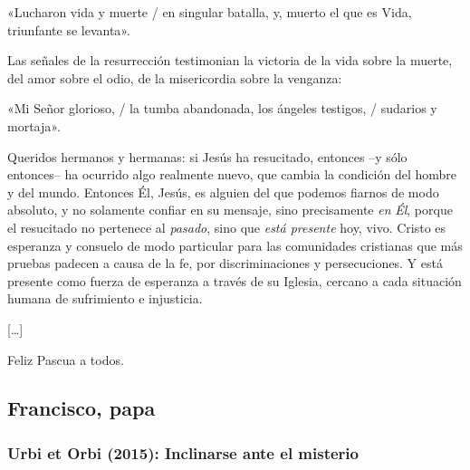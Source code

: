 \begin{body}
\begin{bodyprose}
«Lucharon vida y muerte  /  en singular batalla,  
  y, muerto el que es Vida, triunfante se levanta». 
\end{bodyprose}

Las señales de la resurrección testimonian la victoria de la vida sobre la muerte, del amor sobre el odio, de la misericordia sobre la venganza: 

\begin{bodyprose}
«Mi Señor glorioso,  /  la tumba abandonada, 
   los ángeles testigos, / sudarios y mortaja». 
\end{bodyprose}

Queridos hermanos y hermanas: si Jesús ha resucitado, entonces –y sólo entonces– ha ocurrido algo realmente nuevo, que cambia la condición del hombre y del mundo. Entonces Él, Jesús, es alguien del que podemos fiarnos de modo absoluto, y no solamente confiar en su mensaje, sino precisamente \textit{en} \textit{Él}, porque el resucitado no pertenece al \textit{pasado}, sino que \textit{está presente} hoy, vivo. Cristo es esperanza y consuelo de modo particular para las comunidades cristianas que más pruebas padecen a causa de la fe, por discriminaciones y persecuciones. Y está presente como fuerza de esperanza a través de su Iglesia, cercano a cada situación humana de sufrimiento e injusticia. 

[\ldots]

Feliz Pascua a todos. 
\end{body}


\newsection
\subsection{Francisco, papa}

\subsubsection{Urbi et Orbi (2015): Inclinarse ante el misterio}


